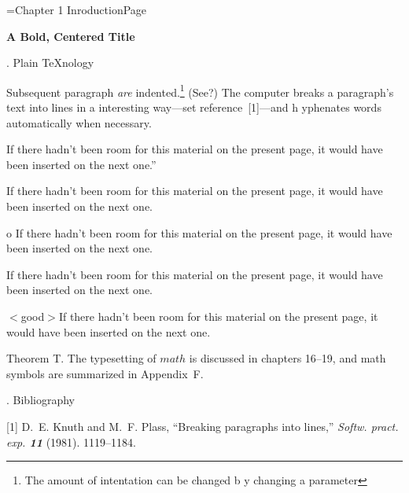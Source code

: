   \hsize=29pc
\vsize=42pc
\footline={\tenrm Chapter 1 Inroduction\quad \dotfill \quad Page \folio}

\topglue 1in

\centerline{\bf A Bold, Centered Title}
\smallskip
{}

. Plain \TeX nology

Subsequent paragraph {\it are} indented.\footnote*{The amount of intentation 
can be changed b y changing a parameter} (See?) The computer breaks a paragraph's
text into lines in a interesting way---set reference~[1]---and h%
yphenates words automatically when necessary.

\midinsert
\narrower\narrower
\noindent {}If there hadn't been room for this material on the present page,
it would have been inserted on the next one.''
\endinsert

\midinsert
\narrower
\noindent {}If there hadn't been room for this material on the present page,
it would have been inserted on the next one.
\endinsert

\midinsert
\noindent \item{o }If there hadn't been room for this material on the present page,
it would have been inserted on the next one.
\endinsert

\midinsert
\narrower
\noindent {}If there hadn't been room for this material on the present page,
it would have been inserted on the next one.
\endinsert

\midinsert
\noindent \item{$<$good$>$}If there hadn't been room for this material on the present page,
it would have been inserted on the next one.
\endinsert


\proclaim Theorem T. The typesetting of $math$ is discussed in chapters 16--19, and 
math symbols are summarized in Appendix~F.

. Bibliography

\frenchspacing
\item{[1]} D.~E. Knuth and M.~F. Plass, ``Breaking paragraphs into lines,''{\sl
 Softw. pract. exp. \bf11} (1981). 1119--1184.
\bye
